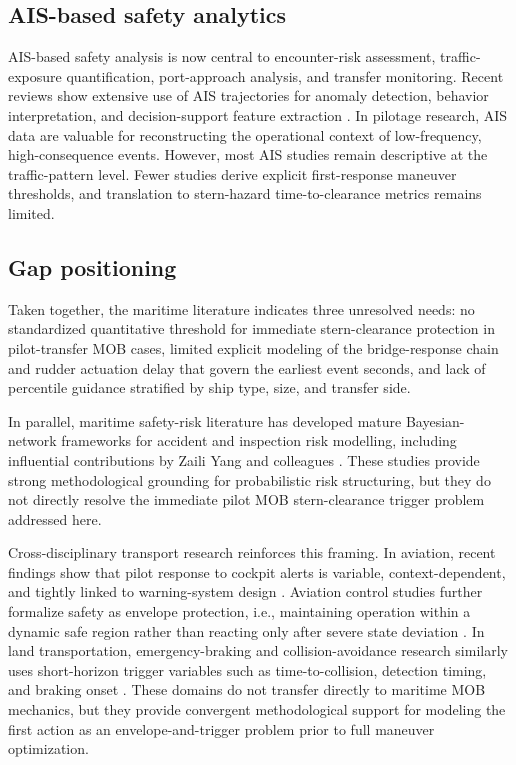 \documentclass[preprint,12pt]{elsarticle}
\begin{document}
\subsection{AIS-based safety analytics}
AIS-based safety analysis is now central to encounter-risk assessment, traffic-exposure quantification, port-approach analysis, and transfer monitoring. Recent reviews show extensive use of AIS trajectories for anomaly detection, behavior interpretation, and decision-support feature extraction \cite{ref_ais_review}. In pilotage research, AIS data are valuable for reconstructing the operational context of low-frequency, high-consequence events. However, most AIS studies remain descriptive at the traffic-pattern level. Fewer studies derive explicit first-response maneuver thresholds, and translation to stern-hazard time-to-clearance metrics remains limited.

\subsection{Gap positioning}
Taken together, the maritime literature indicates three unresolved needs: no standardized quantitative threshold for immediate stern-clearance protection in pilot-transfer MOB cases, limited explicit modeling of the bridge-response chain and rudder actuation delay that govern the earliest event seconds, and lack of percentile guidance stratified by ship type, size, and transfer side.

In parallel, maritime safety-risk literature has developed mature Bayesian-network frameworks for accident and inspection risk modelling, including influential contributions by Zaili Yang and colleagues \cite{ref_yang_bn_maritime2014,ref_yang_psc_bn2018,ref_yang_maritime_accident_bn2020}. These studies provide strong methodological grounding for probabilistic risk structuring, but they do not directly resolve the immediate pilot MOB stern-clearance trigger problem addressed here.

Cross-disciplinary transport research reinforces this framing. In aviation, recent findings show that pilot response to cockpit alerts is variable, context-dependent, and tightly linked to warning-system design \cite{ref_aviation_alerts,ref_aviation_hud}. Aviation control studies further formalize safety as envelope protection, i.e., maintaining operation within a dynamic safe region rather than reacting only after severe state deviation \cite{ref_aviation_envelope}. In land transportation, emergency-braking and collision-avoidance research similarly uses short-horizon trigger variables such as time-to-collision, detection timing, and braking onset \cite{ref_land_aeb,ref_land_detection}. These domains do not transfer directly to maritime MOB mechanics, but they provide convergent methodological support for modeling the first action as an envelope-and-trigger problem prior to full maneuver optimization.
\end{document}
